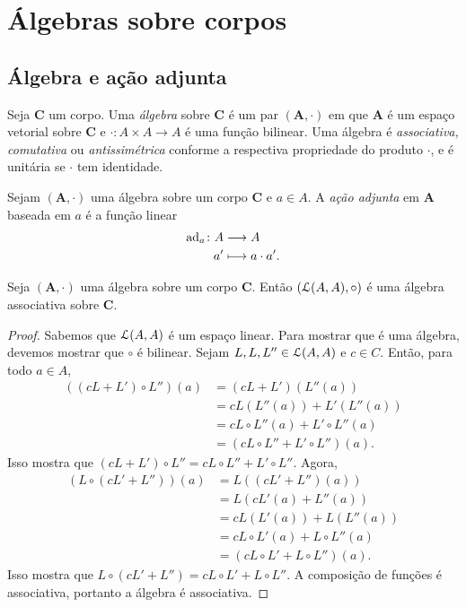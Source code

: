 \chapter{Álgebras sobre corpos}

\section{Álgebra e ação adjunta}

\begin{definition}
Seja $\bm C$ um corpo. Uma \emph{álgebra} sobre $\bm C$ é um par $(\bm A,\cdot)$ em que $\bm A$ é um espaço vetorial sobre $\bm C$ e $\cdot\colon A \times A \to A$ é uma função bilinear. Uma álgebra é \emph{associativa, comutativa} ou \emph{antissimétrica} conforme a respectiva propriedade do produto $\cdot$, e é unitária se $\cdot$ tem identidade.
\end{definition}

\begin{definition}
Sejam $(\bm A,\cdot)$ uma álgebra sobre um corpo $\bm C$ e $a \in A$. A \emph{ação adjunta} em $\bm A$ baseada em $a$ é a função linear
	\begin{align*}
	{\operatorname{ad}_a}\colon {A} &\longrightarrow {A} \\{a'} &\longmapsto a \cdot a'.
	\end{align*}
\end{definition}

\begin{proposition}
Seja $(\bm A,\cdot)$ uma álgebra sobre um corpo $\bm C$. Então $(\mathcal{L}(A,A),\circ)$ é uma álgebra associativa sobre $\bm C$.
\end{proposition}
\begin{proof}
Sabemos que $\mathcal{L}(A,A)$ é um espaço linear. Para mostrar que é uma álgebra, devemos mostrar que $\circ$ é bilinear. Sejam $L,L,L'' \in \mathcal{L}(A,A)$ e $c \in C$. Então, para todo $a \in A$,
	\begin{align*}
	((cL+L') \circ L'')(a) &= (cL+L')(L''(a)) \\
		&= cL(L''(a))+L'(L''(a)) \\
		&= cL \circ L''(a) + L' \circ L''(a) \\
		&= (cL \circ L'' + L' \circ L'')(a).
	\end{align*}
Isso mostra que $(cL+L') \circ L'' = cL \circ L'' + L' \circ L''$. Agora,
	\begin{align*}
	(L \circ (cL'+L''))(a) &= L((cL'+L'')(a)) \\
		&= L(cL'(a)+L''(a)) \\
		&= cL(L'(a))+L(L''(a)) \\
		&= cL \circ L'(a)+L \circ L''(a) \\
		&= (cL \circ L' + L \circ L'')(a).
	\end{align*}
Isso mostra que $L \circ (cL'+L'') = cL \circ L' + L \circ L''$. A composição de funções é associativa, portanto a álgebra é associativa.
\end{proof}

